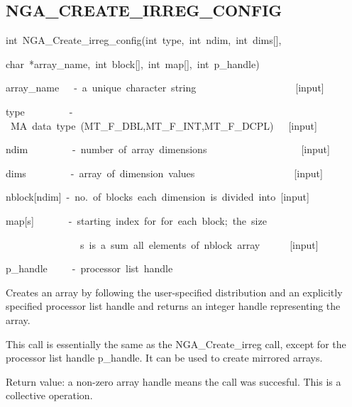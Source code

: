 \subsection*{\label{sub:NGA_CREATE_IRREG_CONFIG}NGA\_CREATE\_IRREG\_CONFIG}
\begin{lyxcode}
int~NGA\_Create\_irreg\_config(int~type,~int~ndim,~int~dims{[}{]},

char~{*}array\_name,~int~block{[}{]},~int~map{[}{]},~int~p\_handle)



array\_name~~~-~a~unique~character~string~~~~~~~~~~~~~~~~~~~~{[}input{]}~

type~~~~~~~~~-~MA~data~type~(MT\_F\_DBL,MT\_F\_INT,MT\_F\_DCPL)~~~{[}input{]}~

ndim~~~~~~~~~-~number~of~array~dimensions~~~~~~~~~~~~~~~~~~~{[}input{]}~

dims~~~~~~~~~-~array~of~dimension~values~~~~~~~~~~~~~~~~~~~~{[}input{]}~

nblock{[}ndim{]}~-~no.~of~blocks~each~dimension~is~divided~into~{[}input{]}~

map{[}s{]}~~~~~~~-~starting~index~for~for~each~block;~the~size~

~~~~~~~~~~~~~~~s~is~a~sum~all~elements~of~nblock~array~~~~~~{[}input{]}~

p\_handle~~~~~-~processor~list~handle
\end{lyxcode}
Creates an array by following the user-specified distribution and
an explicitly specified processor list handle and returns an integer
handle representing the array.

This call is essentially the same as the NGA\_Create\_irreg call,
except for the processor list handle p\_handle. It can be used to
create mirrored arrays.

Return value: a non-zero array handle means the call was succesful.
This is a collective operation. 


